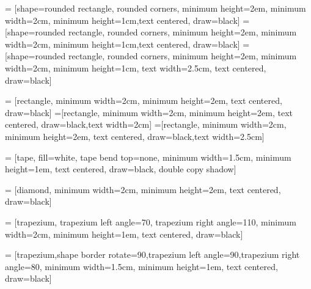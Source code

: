 


 = [shape=rounded rectangle, rounded corners, minimum height=2em, minimum width=2cm, minimum height=1cm,text centered, draw=black]
 = [shape=rounded rectangle, rounded corners, minimum height=2em, minimum width=2cm, minimum height=1cm,text centered, draw=black]
 = [shape=rounded rectangle, rounded corners, minimum height=2em, minimum width=2cm, minimum height=1cm, text width=2.5cm, text centered, draw=black]

 = [rectangle, minimum width=2cm, minimum height=2em, text centered, draw=black]
=[rectangle, minimum width=2cm, minimum height=2em, text centered, draw=black,text width=2cm]
=[rectangle, minimum width=2cm, minimum height=2em, text centered, draw=black,text width=2.5cm]


 = [tape, fill=white, tape bend top=none, minimum width=1.5cm, minimum height=1em, text centered, draw=black, double copy shadow]

 = [diamond, minimum width=2cm, minimum height=2em, text centered, draw=black]

 = [trapezium, trapezium left angle=70, trapezium right angle=110, minimum width=2cm, minimum height=1em, text centered, draw=black]

 = [trapezium,shape border rotate=90,trapezium left angle=90,trapezium right angle=80, minimum width=1.5cm, minimum height=1em, text centered, draw=black]










